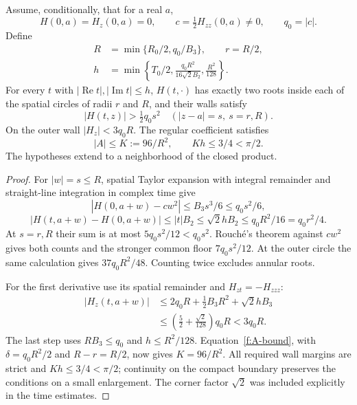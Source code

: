 \begin{theorem}\label{f:double-window}
Assume, conditionally, that for a real $a$,
\[
 H(0,a)=H_z(0,a)=0,\qquad
 c=\tfrac12H_{zz}(0,a)\ne0,
 \qquad q_0=|c|.
\]
Define
\begin{equation}\label{f:window-constants}
 \begin{split}
 R&=\min\{R_0/2,q_0/B_3\},\qquad r=R/2,\\
 h&=\min\left\{T_0/2,
       \frac{q_0R^2}{16\sqrt2 B_2},\frac{R^2}{128}\right\}.
 \end{split}
\end{equation}
For every $t$ with $|\operatorname{Re}t|,|\operatorname{Im}t|\le h$,
$H(t,\cdot)$ has exactly two roots inside each of the spatial circles
of radii $r$ and $R$, and their walls satisfy
\begin{equation}\label{f:double-floors}
 |H(t,z)|>\tfrac12q_0s^2\quad(|z-a|=s,\ s=r,R).
\end{equation}
On the outer wall $|H_z|<3q_0R$.  The regular coefficient satisfies
\begin{equation}\label{f:double-phase}
          |A|\le K:=96/R^2,\qquad Kh\le3/4<\pi/2.
\end{equation}
The hypotheses extend to a neighborhood of the closed product.
\end{theorem}

\begin{proof}
For $|w|=s\le R$, spatial Taylor expansion with integral remainder
and straight-line integration in complex time give
\[
 |H(0,a+w)-cw^2|\le B_3s^3/6\le q_0s^2/6,
\]
\[
 |H(t,a+w)-H(0,a+w)|\le|t|B_2
       \le\sqrt2hB_2\le q_0R^2/16=q_0r^2/4.
\]
At $s=r,R$ their sum is at most $5q_0s^2/12<q_0s^2$.
Rouch\'e's theorem against $cw^2$ gives both counts and the stronger
common floor $7q_0s^2/12$.  At the outer circle the same calculation
gives $37q_0R^2/48$.  Counting twice excludes annular roots.

For the first derivative use its spatial remainder and
$H_{zt}=-H_{zzz}$:
\[
 \begin{split}
 |H_z(t,a+w)|
 &\le2q_0R+\tfrac12 B_3R^2+\sqrt2hB_3\\
 &\le\left(\tfrac52+\frac{\sqrt2}{128}\right)q_0R<3q_0R.
 \end{split}
\]
The last step uses $RB_3\le q_0$ and $h\le R^2/128$.
Equation~\eqref{f:A-bound}, with
$\delta=q_0R^2/2$ and $R-r=R/2$, now gives $K=96/R^2$.
All required wall margins are strict and $Kh\le3/4<\pi/2$;
continuity on the compact boundary preserves the conditions on a
small enlargement.  The corner factor $\sqrt2$ was included explicitly
in the time estimates.
\end{proof}

